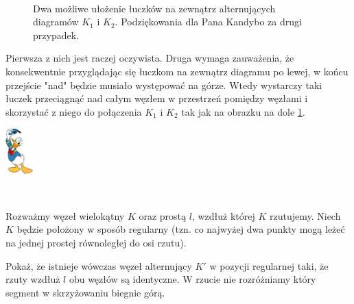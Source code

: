 \documentclass{article}
\renewenvironment{proof}{{\bfseries\color{orange} Dowód}$ $\newline}{
  \begin{flushright}\includegraphics[width=30pt]{Donald_Duck.png}\end{flushright}$ $\newline
}
\begin{document}
\begin{proof}
\begin{figure}[h]
    \caption{\label{fakt 1 dowodzik}Dwa możliwe ułożenie łuczków na zewnątrz alternujących diagramów $K_1$ i $K_2$. Podziękowania dla Pana Kandybo za drugi przypadek.}
  \end{figure}
  
  Pierwsza z nich jest raczej oczywista. Druga wymaga zauważenia, że konsekwentnie przyglądając się łuczkom na zewnątrz diagramu po lewej, w końcu przejście "nad" będzie musiało występować na górze. Wtedy wystarczy taki łuczek przeciągnąć nad całym węzłem w przestrzeń pomiędzy węzłami i skorzystać z niego do połączenia $K_1$ i $K_2$ tak jak na obrazku na dole \cref{fakt 1 dowodzik}. 
\end{proof}

\begin{problem}
  Rozważmy węzeł wielokątny $K$ oraz prostą $l$, wzdłuż której $K$ rzutujemy. Niech $K$ będzie położony w sposób regularny (tzn. co najwyżej dwa punkty mogą leżeć na jednej prostej równoległej do osi rzutu). 

  Pokaż, że istnieje wówczas węzeł alternujący $K'$ w pozycji regularnej taki, że rzuty wzdłuż $l$ obu węzłów są identyczne. W rzucie nie rozróżniamy który segment w skrzyżowaniu biegnie górą.
  
\end{problem}
%
\end{document}
